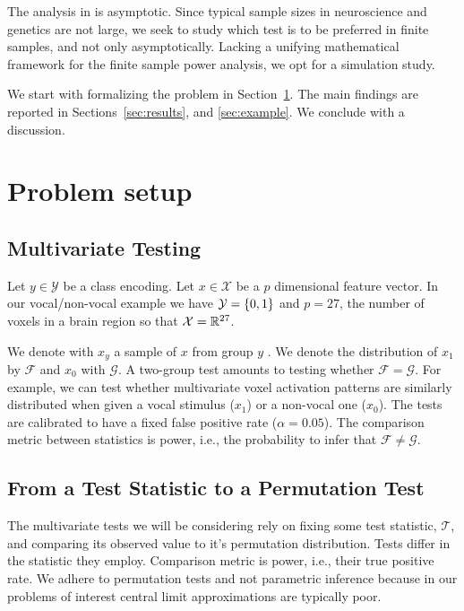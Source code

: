 \documentclass[]{bio}
\begin{document}
The analysis in \cite{ramdas_classification_2016} is asymptotic. 
Since typical sample sizes in neuroscience and genetics are not large, we seek to study which test is to be preferred in finite samples, and not only asymptotically.
Lacking a unifying mathematical framework for the finite sample power analysis, we opt for a simulation study. 

We start with formalizing the problem in Section~\ref{sec:problem_setup}.
The main findings are reported in Sections~\ref{sec:results}, and \ref{sec:example}.
We conclude with a discussion.







\section{Problem setup}
\label{sec:problem_setup}


\subsection{Multivariate Testing}

Let $y \in \mathcal{Y}$ be a class encoding. 
Let $x \in \mathcal{X}$ be a $p$ dimensional feature vector. 
In our vocal/non-vocal example we have $\mathcal{Y}=\{ 0,1 \}$ and $p=27$, the number of voxels in a brain region so that $\mathcal{X}=\mathbb{R}^{27}$. 

We denote with $x_y$ a sample of $x$ from group $y$ .
We denote the distribution of $x_1$ by $\mathcal{F}$ and $x_0$ with $\mathcal{G}$.
A two-group test amounts to testing whether $\mathcal{F}=\mathcal{G}$.
For example, we can test whether multivariate voxel activation patterns are similarly distributed when given a vocal stimulus ($x_1$) or a non-vocal one ($x_0$).
The tests are calibrated to have a fixed false positive rate ($\alpha=0.05$).
The comparison metric between statistics is power, i.e., the probability to infer that $\mathcal{F}\neq\mathcal{G}$.


\subsection{From a Test Statistic to a Permutation Test}

The multivariate tests we will be considering rely on fixing some test statistic, $\mathcal{T}$, and comparing its observed value to it's permutation distribution. 
Tests differ in the statistic they employ.
Comparison metric is power, i.e., their true positive rate. 
We adhere to permutation tests and not parametric inference because in our problems of interest central limit approximations are typically poor.
\end{document}
